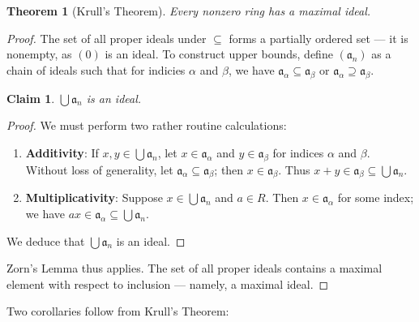 \documentclass[11pt]{article}
\newtheorem{theorem}{Theorem}
\newtheorem{claim}{Claim}
\begin{document}
\begin{adjustwidth}{0.5cm}{}
	\begin{theorem}[Krull's Theorem]
		Every nonzero ring has a maximal ideal.
	\end{theorem}
	\begin{proof}
		The set of all proper ideals under $\subseteq$ forms a partially ordered set --- it is nonempty, as $(0)$ is an ideal. To construct upper bounds, define $(\mathfrak{a}_{n})$ as a chain of ideals such that for indicies $\alpha$ and $\beta$, we have $\mathfrak{a}_{\alpha} \subseteq \mathfrak{a}_{\beta}$ or $\mathfrak{a}_{\alpha} \supseteq \mathfrak{a}_{\beta}$.
		\begin{adjustwidth}{0.5cm}{}
			\begin{claim}
				$\bigcup \mathfrak{a}_{n}$ is an ideal. 
			\end{claim}
			\begin{proof}\renewcommand{\qedsymbol}{}
				We must perform two rather routine calculations:
				\begin{enumerate}
					\item \textbf{Additivity}: If $x, y \in \bigcup \mathfrak{a}_{n}$, let $x \in \mathfrak{a}_{\alpha}$ and $y \in \mathfrak{a}_{\beta}$ for indices $\alpha$ and $\beta$. Without loss of generality, let $\mathfrak{a}_{\alpha} \subseteq \mathfrak{a}_{\beta}$; then $x \in \mathfrak{a}_{\beta}$. Thus $x + y \in \mathfrak{a}_{\beta} \subseteq \bigcup \mathfrak{a}_{n}$.
					\item \textbf{Multiplicativity}: Suppose $x \in \bigcup \mathfrak{a}_{n}$ and $a \in R$. Then $x \in \mathfrak{a}_{\alpha}$ for some index; we have $ax \in \mathfrak{a}_{\alpha} \subseteq \bigcup \mathfrak{a}_{n}$.
				\end{enumerate}
				We deduce that $\bigcup \mathfrak{a}_{n}$ is an ideal.
			\end{proof}
		\end{adjustwidth}
		Zorn's Lemma thus applies. The set of all proper ideals contains a maximal element with respect to inclusion --- namely, a maximal ideal.
	\end{proof}
\end{adjustwidth}

Two corollaries follow from Krull's Theorem:

\newpage
\end{document}
